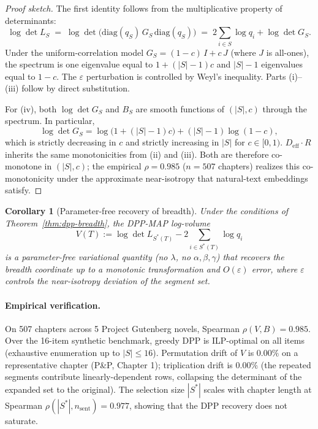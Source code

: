 \documentclass[11pt]{article}
\newtheorem{corollary}[theorem]{Corollary}
\begin{document}
\begin{proof}[Proof sketch]
The first identity follows from the multiplicative property of determinants:
\[
\log \det L_S \;=\; \log \det\!\big(\mathrm{diag}(q_S)\, G_S\, \mathrm{diag}(q_S)\big) \;=\; 2 \sum_{i \in S} \log q_i + \log \det G_S.
\]
Under the uniform-correlation model $G_S = (1-c)\,I + c\,J$ (where $J$ is all-ones), the spectrum is one eigenvalue equal to $1 + (|S|-1)c$ and $|S|-1$ eigenvalues equal to $1-c$. The $\varepsilon$ perturbation is controlled by Weyl's inequality. Parts (i)--(iii) follow by direct substitution.

For (iv), both $\log \det G_S$ and $B_S$ are smooth functions of $(|S|, c)$ through the spectrum. In particular,
\[
\log \det G_S = \log\!\big(1 + (|S|-1)c\big) + (|S|-1)\log(1-c),
\]
which is strictly decreasing in $c$ and strictly increasing in $|S|$ for $c \in [0,1)$. $D_{\mathrm{eff}} \cdot R$ inherits the same monotonicities from (ii) and (iii). Both are therefore co-monotone in $(|S|, c)$; the empirical $\rho = 0.985$ ($n = 507$ chapters) realizes this co-monotonicity under the approximate near-isotropy that natural-text embeddings satisfy.
\end{proof}

\begin{corollary}[Parameter-free recovery of breadth]\label{cor:dpp}
Under the conditions of Theorem~\ref{thm:dpp-breadth}, the DPP-MAP log-volume
\[
V(T) := \log \det L_{S^*(T)} - 2 \sum_{i \in S^*(T)} \log q_i
\]
is a parameter-free variational quantity (no $\lambda$, no $\alpha, \beta, \gamma$) that recovers the breadth coordinate up to a monotonic transformation and $O(\varepsilon)$ error, where $\varepsilon$ controls the near-isotropy deviation of the segment set.
\end{corollary}

\paragraph{Empirical verification.} On 507 chapters across 5 Project Gutenberg novels, Spearman $\rho(V, B) = 0.985$. Over the 16-item synthetic benchmark, greedy DPP is ILP-optimal on all items (exhaustive enumeration up to $|S| \leq 16$). Permutation drift of $V$ is $0.00\%$ on a representative chapter (P\&P, Chapter 1); triplication drift is $0.00\%$ (the repeated segments contribute linearly-dependent rows, collapsing the determinant of the expanded set to the original). The selection size $|S^*|$ scales with chapter length at Spearman $\rho(|S^*|, n_{\mathrm{sent}}) = 0.977$, showing that the DPP recovery does not saturate.
\end{document}
